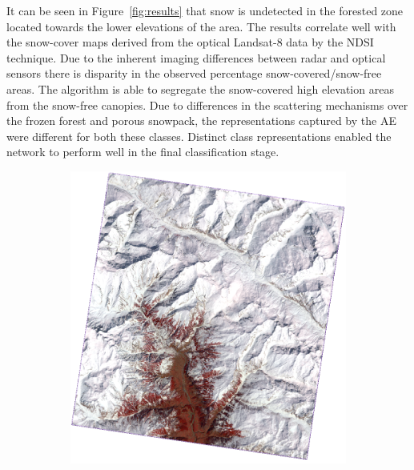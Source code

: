 It can be seen in Figure~\ref{fig:results} that snow is undetected in the forested zone located towards the lower elevations of the area. The results correlate well with the snow-cover maps derived from the optical Landsat-8 data by the NDSI technique. Due to the inherent imaging differences between radar and optical sensors there is disparity in the observed percentage snow-covered/snow-free areas. 
%
The algorithm is able to segregate the snow-covered high elevation areas from the snow-free canopies. Due to differences in the scattering mechanisms over the frozen forest and porous snowpack, the representations captured by the AE were different for both these classes. Distinct class representations enabled the network to perform well in the final classification stage. 

\begin{figure}
\centering
\begin{subfigure}[b]{0.45\columnwidth}
\includegraphics[width=\textwidth]{Figures/SnowCover2018/FCC}
\caption{}
\end{subfigure}
~
\begin{subfigure}[b]{0.45\columnwidth}

\end{subfigure}
\end{figure}
